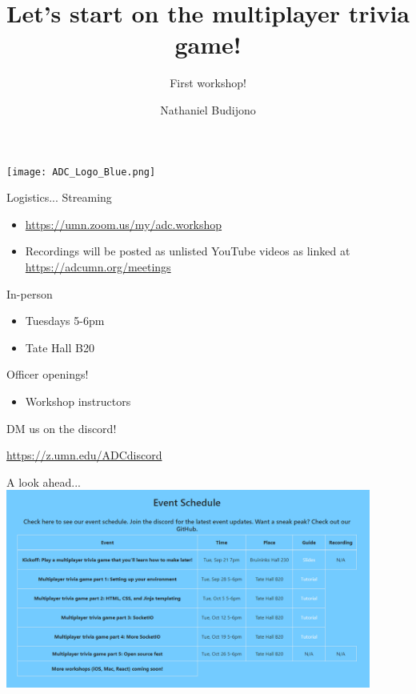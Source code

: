 \documentclass{beamer}
\title{Let's start on the multiplayer trivia game!}
\subtitle{First workshop!}
\author{Nathaniel Budijono}
\institute{UMN ADC}
\begin{document}
\begin{frame}
    \titlepage
    \texttt{[image: ADC\_Logo\_Blue.png]}
\end{frame}

\begin{frame}{Logistics...}
	Streaming
	\begin{itemize}
		\item \href{https://umn.zoom.us/my/adc.workshop}{https://umn.zoom.us/my/adc.workshop}
		\item Recordings will be posted as unlisted YouTube videos as linked at \href{https://adcumn.org/meetings}{https://adcumn.org/meetings}
	\end{itemize}

	\bigskip\pause

	In-person
	\begin{itemize}
		\item Tuesdays 5-6pm
		\item Tate Hall B20
	\end{itemize}
\end{frame}

\begin{frame}{Officer openings!}
	\begin{itemize}
		\item Workshop instructors
	\end{itemize}

	\bigskip

	DM us on the discord!

	\bigskip

	\href{https://z.umn.edu/ADCdiscord}{https://z.umn.edu/ADCdiscord}
\end{frame}

\begin{frame}{A look ahead...}
	\centering
	\includegraphics[width=0.9\textwidth]{schedule.png}
\end{frame}
\end{document}
